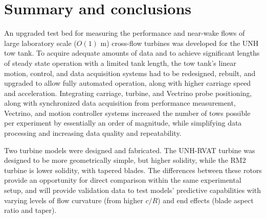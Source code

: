 \section{Summary and conclusions}

An upgraded test bed for measuring the performance and near-wake flows of large
laboratory scale ($O(1)$ m) cross-flow turbines was developed for the UNH tow
tank. To acquire adequate amounts of data and to achieve significant lengths of
steady state operation with a limited tank length, the tow tank's linear motion,
control, and data acquisition systems had to be redesigned, rebuilt, and
upgraded to allow fully automated operation, along with higher carriage speed
and acceleration. Integrating carriage, turbine, and Vectrino probe positioning,
along with synchronized data acquisition from performance measurement, Vectrino,
and motion controller systems increased the number of tows possible per
experiment by essentially an order of magnitude, while simplifying data
processing and increasing data quality and repeatability.

Two turbine models were designed and fabricated. The UNH-RVAT turbine was
designed to be more geometrically simple, but higher solidity, while the RM2
turbine is lower solidity, with tapered blades. The differences between these
rotors provide an opportunity for direct comparison within the same experimental
setup, and will provide validation data to test models' predictive capabilities
with varying levels of flow curvature (from higher $c/R$) and end effects (blade
aspect ratio and taper).
